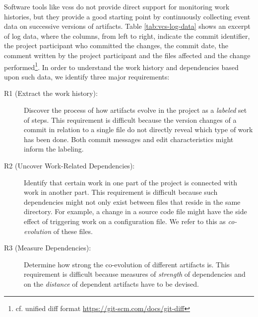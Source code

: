 


Software tools like \glspl{vcs} do not provide direct support for monitoring work histories, but they provide a good starting point by continuously collecting event data on successive versions of artifacts.
Table \ref{tab:vcs-log-data} shows an excerpt of log data, where the columns, from left to right, indicate the commit identifier, the project participant who committed the changes, the commit date, the comment written by the project participant and the files affected and the change performed\footnote{cf. unified diff format  \url{https://git-scm.com/docs/git-diff}}. In order to understand the work history and dependencies based upon such data, we identify three major requirements:

\begin{description}
	\item [R1 (Extract the work history):] Discover the process of how artifacts evolve in the project as a \emph{labeled} set of steps. This requirement is difficult because the version changes of a commit in relation to a single file do not directly reveal which type of work has been done. Both commit messages and edit characteristics might inform the labeling.	
	\item [R2 (Uncover Work-Related Dependencies):] Identify that certain work in one part of the project is connected with work in another part. This requirement is difficult because such dependencies might not only exist between files that reside in the same directory. For example, a change in a source code file might have the side effect of triggering work on a configuration file. We refer to this as \emph{co-evolution} of these files.
	\item [R3 (Measure Dependencies):] Determine how strong the co-evolution of different artifacts is. This requirement is difficult because measures of \emph{strength} of dependencies and on the \emph{distance} of   dependent artifacts have to be devised.
\end{description}
